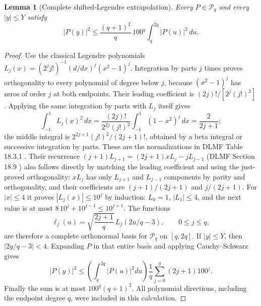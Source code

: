 \documentclass[11pt,a4paper]{article}
\newtheorem{lemma}[theorem]{Lemma}
\begin{document}
\begin{lemma}[Complete shifted-Legendre extrapolation]
Every $P\in\mathcal P_q$ and every $|y|\leq Y$ satisfy
\[
 |P(y)|^2\leq\frac{(q+1)^2}{q}\,100^q
                    \int_q^{2q}|P(u)|^2\,du.     \tag{RC8}
\]
\end{lemma}
\begin{proof}
Use the classical Legendre polynomials
$L_j(x)=(2^j j!)^{-1}(d/dx)^j(x^2-1)^j$.
Integration by parts $j$ times proves orthogonality to every polynomial
of degree below $j$, because $(x^2-1)^j$ has zeros of order $j$ at both
endpoints.
Their leading coefficient is $(2j)!/[2^j(j!)^2]$.
Applying the same integration by parts with $L_j$ itself gives
\[
 \int_{-1}^1L_j(x)^2\,dx
 =\frac{(2j)!}{2^{2j}(j!)^2}
                 \int_{-1}^1(1-x^2)^j\,dx
 =\frac2{2j+1};
\]
the middle integral is
$2^{2j+1}(j!)^2/(2j+1)!$, obtained by a beta integral or
successive integration by parts.
These are the normalizations in DLMF Table 18.3.1
\cite{rc:DLMF183}.
Their recurrence
$(j+1)L_{j+1}=(2j+1)xL_j-jL_{j-1}$
(DLMF Section 18.9 \cite{rc:DLMF189}) also follows directly by matching
the leading coefficient and using the just-proved orthogonality:
$xL_j$ has only $L_{j+1}$ and $L_{j-1}$ components by parity and
orthogonality, and their coefficients are
$(j+1)/(2j+1)$ and $j/(2j+1)$.
For $|x|\leq4$ it proves $|L_j(x)|\leq10^j$ by induction:
$L_0=1$, $|L_1|\leq4$, and the next value is at most
$8\,10^j+10^{j-1}\leq10^{j+1}$.
The functions
\[
 \ell_j(u)=\sqrt{\frac{2j+1}{q}}\,L_j(2u/q-3),
 \qquad 0\leq j\leq q,
\]
are therefore a complete orthonormal basis for $\mathcal P_q$ on
$[q,2q]$. If $|y|\leq Y$, then $|2y/q-3|<4$.
Expanding $P$ in that entire basis and applying Cauchy--Schwarz gives
\[
 |P(y)|^2\leq
 \left(\int_q^{2q}|P(u)|^2du\right)
 \frac1q\sum_{j=0}^q(2j+1)100^j.
\]
Finally the sum is at most $100^q(q+1)^2$.
All polynomial directions, including the endpoint degree $q$, were
included in this calculation.
\end{proof}
\end{document}
